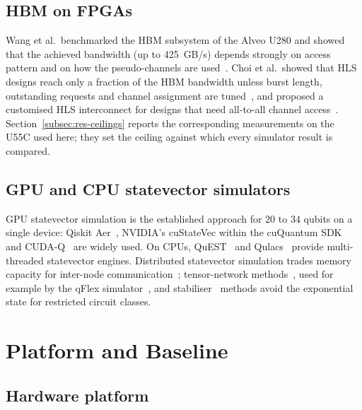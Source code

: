 \documentclass[pdflatex,sn-mathphys-num]{sn-jnl}
\theoremstyle{thmstyleone}
\theoremstyle{thmstylethree}
\begin{document}
\subsection{HBM on FPGAs}\label{subsec:related-hbm}

Wang et al.\ benchmarked the HBM subsystem of the Alveo U280 and showed that the achieved bandwidth (up to 425~GB/s) depends strongly on access pattern and on how the pseudo-channels are used~\cite{wang2020shuhai}. Choi et al.\ showed that HLS designs reach only a fraction of the HBM bandwidth unless burst length, outstanding requests and channel assignment are tuned~\cite{choi2020hlshbm}, and proposed a customised HLS interconnect for designs that need all-to-all channel access~\cite{choi2021hbmconnect}. Section~\ref{subsec:res-ceilings} reports the corresponding measurements on the U55C used here; they set the ceiling against which every simulator result is compared.

\subsection{GPU and CPU statevector simulators}\label{subsec:related-gpu}

GPU statevector simulation is the established approach for 20 to 34 qubits on a single device: Qiskit Aer~\cite{qiskit2024}, NVIDIA's cuStateVec within the cuQuantum SDK~\cite{bayraktar2023cuquantum} and CUDA-Q~\cite{nvidia2024cudaq} are widely used. On CPUs, QuEST~\cite{jones2019quest} and Qulacs~\cite{suzuki2021qulacs} provide multi-threaded statevector engines. Distributed statevector simulation trades memory capacity for inter-node communication~\cite{chen2018quantum,pednault2017breaking}; tensor-network methods~\cite{vidal2003efficient,markov2008simulating}, used for example by the qFlex simulator~\cite{villalonga2019flexible}, and stabiliser~\cite{gottesman1998heisenberg,aaronson2004improved} methods avoid the exponential state for restricted circuit classes.
\section{Platform and Baseline}\label{sec:baseline}

\subsection{Hardware platform}\label{subsec:platform}
\end{document}
